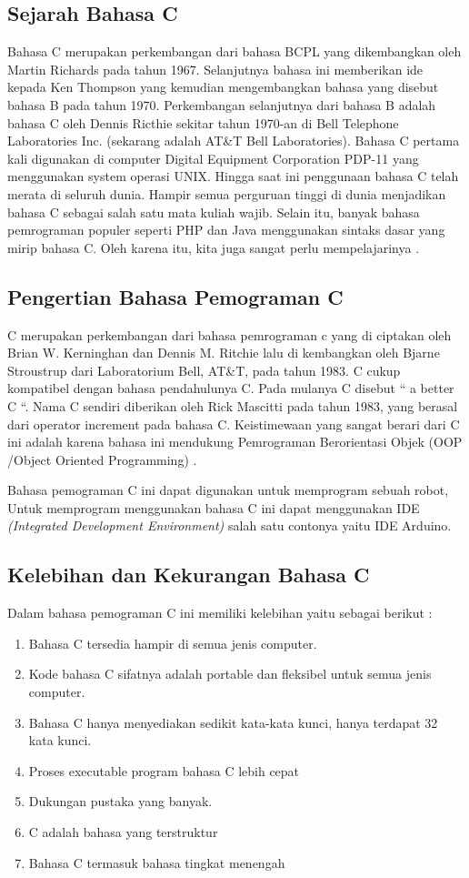 \subsection{Sejarah Bahasa C}
Bahasa C merupakan perkembangan dari bahasa BCPL yang dikembangkan oleh Martin Richards pada tahun 1967. Selanjutnya bahasa ini memberikan ide kepada Ken Thompson yang kemudian mengembangkan bahasa yang disebut bahasa B pada tahun 1970. Perkembangan selanjutnya dari bahasa B adalah bahasa C oleh Dennis Ricthie sekitar tahun 1970-an di Bell Telephone Laboratories Inc. (sekarang adalah AT&T Bell Laboratories). Bahasa C pertama kali digunakan di computer Digital Equipment Corporation PDP-11 yang menggunakan system operasi UNIX. Hingga saat ini penggunaan bahasa C telah merata di seluruh dunia. Hampir semua perguruan tinggi di dunia menjadikan bahasa C sebagai salah satu mata kuliah wajib. Selain itu, banyak bahasa pemrograman populer seperti PHP dan Java menggunakan sintaks dasar yang mirip bahasa C. Oleh karena itu, kita juga sangat perlu mempelajarinya .
    
\subsection{Pengertian Bahasa Pemograman C}
C merupakan perkembangan dari bahasa pemrograman c yang di ciptakan oleh Brian W. Kerninghan dan Dennis M. Ritchie lalu di kembangkan oleh Bjarne Stroustrup dari Laboratorium Bell, AT&T, pada tahun 1983. C cukup kompatibel dengan bahasa pendahulunya C. Pada mulanya C disebut “ a better C “. Nama C sendiri diberikan oleh Rick Mascitti pada tahun 1983, yang berasal dari operator increment pada bahasa C. Keistimewaan yang sangat berari dari C ini adalah karena bahasa ini mendukung Pemrograman Berorientasi Objek (OOP /Object Oriented Programming) .

Bahasa pemograman C ini dapat digunakan untuk memprogram sebuah robot, Untuk memprogram menggunakan bahasa C ini dapat menggunakan IDE \textit{ (Integrated Development Environment)} salah satu contonya yaitu IDE Arduino. 

\subsection{Kelebihan dan Kekurangan Bahasa C}
Dalam bahasa pemograman C ini memiliki  kelebihan yaitu sebagai berikut :
\begin{enumerate}
\item Bahasa C tersedia hampir di semua jenis computer. 
\item Kode bahasa C sifatnya adalah portable dan fleksibel untuk semua jenis computer. 
\item Bahasa C hanya menyediakan sedikit kata-kata kunci, hanya terdapat 32 kata kunci.
\item Proses executable program bahasa C lebih cepat 
\item Dukungan pustaka yang banyak.
\item C adalah bahasa yang terstruktur 
\item Bahasa C termasuk bahasa tingkat menengah

\end{enumerate}

